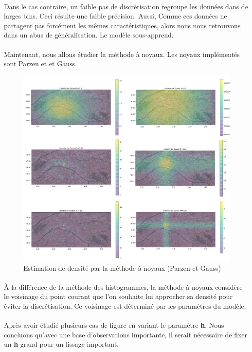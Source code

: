 \documentclass{article}
\begin{document}
\paragraph{}
Dans le cas contraire, un faible pas de discrétisation regroupe les données dans de larges bins. Ceci résulte une faible précision. Aussi, Comme ces données ne partagent pas forcément les mêmes caractéristiques, alors  nous nous retrouvons dans un abus de généralisation. Le modèle sous-apprend.
\paragraph{}
Maintenant, nous allons étudier la méthode à noyaux. Les noyaux implémentés sont Parzen et et Gauss.
\begin{figure}[H]
	\begin{center}
		\includegraphics[width=1\textwidth]{parzen_vs_gauss.png}
		\caption{Estimation de densité par la méthode à noyaux (Parzen et Gauss)}
	\end{center}
\end{figure}
\paragraph{}
À la différence de la méthode des histogrammes, la méthode à noyaux considère le voisinage du point courant que l'on souhaite lui approcher sa densité pour éviter la discrétisation. Ce voisinage est déterminé par les paramètres du modèle.
\paragraph{}
Après avoir étudié plusieurs cas de figure en variant le paramètre \textbf{h}. Nous concluons qu'avec une base d'observations importante, il serait nécessaire de fixer un \textbf{h} grand pour un lissage important. 
\end{document}
